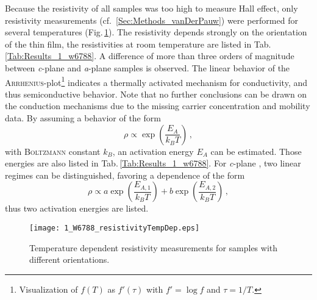 Because the resistivity of all samples was too high to measure Hall effect, only resistivity measurements (cf.~\ref{Sec:Methods_vanDerPauw}) were performed for several temperatures (Fig.\,\ref{Fig:Results_1_w6788_TdH}).
The resistivity depends strongly on the orientation of the thin film, the resistivities at room temperature are listed in Tab.\,\ref{Tab:Results_1_w6788}.
A difference of more than three orders of magnitude between \textit{c}-plane and \textit{a}-plane samples is observed.
The linear behavior of the \textsc{Arrhenius}-plot\footnote{
    Visualization of $f(T)$ as $f'(\tau)$ with $f'=\log f$ and $\tau=1/T$.
}
indicates a thermally activated mechanism for conductivity, and thus semiconductive behavior.
Note that no further conclusions can be drawn on the conduction mechanisms due to the missing carrier concentration and mobility data.
By assuming a behavior of the form
\begin{equation}
    \rho\propto\exp\left(\frac{E_A}{k_BT}\right)\,,
\end{equation}
with \textsc{Boltzmann} constant $k_B$, an activation energy $E_A$ can be estimated.
Those energies are also listed in Tab.\,\ref{Tab:Results_1_w6788}.
For \textit{c}-plane \cro, two linear regimes can be distinguished, favoring a dependence of the form
\begin{equation}
    \rho\propto a\exp\left(\frac{E_{A,1}}{k_BT}\right)
    +b\exp\left(\frac{E_{A,2}}{k_BT}\right)\,,
\end{equation}
thus two activation energies are listed.
\begin{figure}
    \centering
    \texttt{[image: 1\_W6788\_resistivityTempDep.eps]}
    \caption{
        Temperature dependent resistivity measurements for samples with different orientations.
    }
    \label{Fig:Results_1_w6788_TdH}
\end{figure}